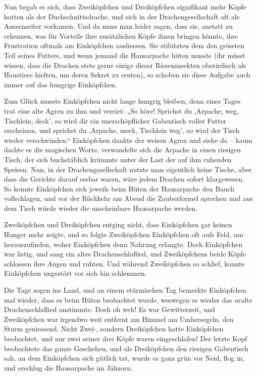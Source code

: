 \documentclass[10pt, a4paper, oneside]{book}
\begin{document}
Nun begab es sich, dass Zweiköpfchen und Dreiköpfchen signifikant mehr Köpfe hatten als der Duchschnittsdrache, und sich in der Drachengesellschaft oft als Aussenseiter vorkamen. Und da muss man leider sagen, dass sie, anstatt zu erkennen, was für Vorteile ihre zusätzlichen Köpfe ihnen bringen könnte, ihre Frustration oftmals am Einköpfchen ausliessen. Sie stibitzten dem den grössten Teil seines Futters, und wenn jemand die Hausarpache hüten musste (ihr müsst wissen, dass die Drachen stets gerne einige dieser Rieseninsekten oberirdisch als Haustiere hielten, um deren Sekret zu ernten), so schoben sie diese Aufgabe auch immer auf das hungrige Einköpfchen.



Zum Glück musste Einköpfchen nicht lange hungrig bleiben, denn eines Tages trat eine alte Agren zu ihm und verriet: „So höre! Sprichst du ‚Arpache, weg, Tischlein, deck’, so wird dir ein unerschöpflicher Gabentisch voller Futter erscheinen, und sprichst du ‚Arpache, meck, Tischlein weg’, so wird der Tisch wieder verschwinden.“ Einköpfchen dankte der weisen Agren und siehe da – kaum dachte es die magischen Worte, verwandelte sich die Arpache in einen riesigen Tisch, der sich buchstäblich krümmte unter der Last der auf ihm ruhenden Speisen. Nun, in der Drachengesellschaft nutzte man eigentlich keine Tische, aber dass die Gerichte darauf essbar waren, wäre jedem Drachen sofort klargewesen. So konnte Einköpfchen sich jeweils beim Hüten der Hausarpache den Bauch vollschlagen, und vor der Rückkehr am Abend die Zauberformel sprechen und aus dem Tisch würde wieder die unscheinbare Hausarpache werden.



Zweiköpfchen und Dreiköpfchen entging nicht, dass Einköpfchen gar keinen Hunger mehr zeigte, und so folgte Zweiköpfchen Einköpfchen oft aufs Feld, um herauszufinden, woher Einköpfchen denn Nahrung erlangte. Doch Einköpfchen war listig, und sang ein altes Drachenschlaflied, und Zweiköpfchens beide Köpfe schlossen ihre Augen und ruhten. Und während Zweiköpfchen so schlief, konnte Einköpfchen ungestört vor sich hin schlemmen.



Die Tage zogen ins Land, und an einem stürmischen Tag bemerkte Einköpfchen mal wieder, dass es beim Hüten beobachtet wurde, weswegen es wieder das uralte Drachenschlaflied anstimmte. Doch oh weh! Es war Gewitterzeit, und Zweiköpfchen war irgendwo weit entfernt am Himmel am Umhersegeln, den Sturm geniessend. Nicht Zwei-, sondern Dreiköpfchen hatte Einköpfchen beobachtet, und nur zwei seiner drei Köpfe waren eingeschlafen! Der letzte Kopf beobachtete das ganze Geschehen, und als Dreiköpfchen den riesigen Gabentisch sah, an dem Einköpfchen sich gütlich tat, wurde es ganz grün vor Neid, flog in, und erschlug die Hausarpache im Jähzorn.
\end{document}

